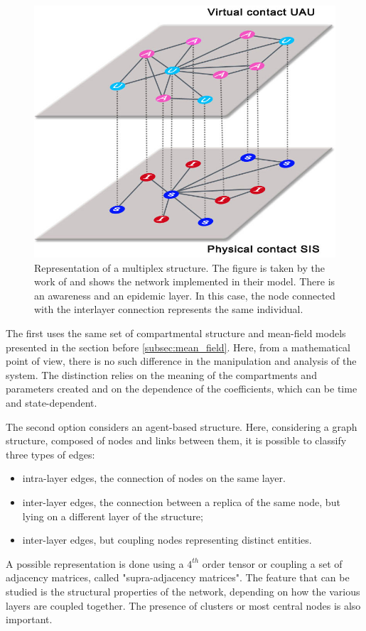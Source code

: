 \begin{figure}[]
	\centering
	\includegraphics[width=0.6\linewidth]{0_introduction/images_introduction/multi_layer}
	\caption[Multi-layer network]{Representation of a multiplex structure. The figure is taken by the work of \cite{Granell2013} and shows the network implemented in their model. There is an awareness and an epidemic layer. In this case, the node connected with the interlayer connection represents the same individual.}
	\label{fig:multilayer}
\end{figure}

The first uses the same set of compartmental structure and mean-field models presented in the section before \ref{subsec:mean_field}. Here, from a mathematical point of view, there is no such difference in the manipulation and analysis of the system. The distinction relies on the meaning of the compartments and parameters created and on the dependence of the coefficients, which can be time and state-dependent.

The second option considers an agent-based structure. Here, considering a graph structure, composed of nodes and links between them, it is possible to classify three types of edges:
\begin{itemize}
	\item intra-layer edges, the connection of nodes on the same layer.
	\item inter-layer edges, the connection between a replica of the same node, but lying on a different layer of the structure;
	\item inter-layer edges, but coupling nodes representing distinct entities. 
\end{itemize}

A possible representation is done using a $4^{th}$ order tensor or coupling a set of adjacency matrices, called "supra-adjacency matrices". The feature that can be studied is the structural properties of the network, depending on how the various layers are coupled together. The presence of clusters or most central nodes is also important.
